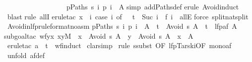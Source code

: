 \begin{isabellebody}
\ \ \ \ \ \ \ \ \ \ \ \ \ \ \ \ {\isasymlongrightarrow}\ {\isacharparenleft}{\isasymexists}\ p{\isasymin}Paths\ s{\isachardot}\ {\isasymforall}i{\isachardot}\ p\ i\ {\isasymnotin}\ A{\isacharparenright}{\isachardoublequote}\isanewline
{}simp\ add{\isacharcolon}Paths{\isacharunderscore}def{\isacharparenright}\isanewline
{}erule\ Avoid{\isachardot}induct{\isacharparenright}\isanewline
\ blast{\isacharparenright}\isanewline
{}rule\ allI{\isacharparenright}\isanewline
{}erule{\isacharunderscore}tac\ x\ {\isacharequal}\ {\isachardoublequote}{\isasymlambda}i{\isachardot}\ case\ i\ of\ \ {\isasymRightarrow}\ t\ {\isacharbar}\ Suc\ i\ {\isasymRightarrow}\ f\ i{\isachardoublequote}\ \ allE{\isacharparenright}\isanewline
{}force\ split{\isacharcolon}nat{\isachardot}split{\isacharparenright}\isanewline
\isanewline
{}\ Avoid{\isacharunderscore}in{\isacharunderscore}lfp{\isacharbrackleft}rule{\isacharunderscore}format{\isacharparenleft}no{\isacharunderscore}asm{\isacharparenright}{\isacharbrackright}{\isacharcolon}\isanewline
{\isachardoublequote}{\isasymforall}p{\isasymin}Paths\ s{\isachardot}\ {\isasymexists}i{\isachardot}\ p\ i\ {\isasymin}\ A\ {\isasymLongrightarrow}\ t\ {\isasymin}\ Avoid\ s\ A\ {\isasymlongrightarrow}\ t\ {\isasymin}\ lfp{\isacharparenleft}af\ A{\isacharparenright}{\isachardoublequote}\isanewline
{}subgoal{\isacharunderscore}tac\ {\isachardoublequote}wf{\isacharbraceleft}{\isacharparenleft}y{\isacharcomma}x{\isacharparenright}{\isachardot}\ {\isacharparenleft}x{\isacharcomma}y{\isacharparenright}{\isasymin}M\ {\isasymand}\ x\ {\isasymin}\ Avoid\ s\ A\ {\isasymand}\ y\ {\isasymin}\ Avoid\ s\ A\ {\isasymand}\ x\ {\isasymnotin}\ A{\isacharbraceright}{\isachardoublequote}{\isacharparenright}\isanewline
\ erule{\isacharunderscore}tac\ a\ {\isacharequal}\ t\ \ wf{\isacharunderscore}induct{\isacharparenright}\isanewline
\ clarsimp{\isacharparenright}\isanewline
\ rule\ ssubst\ {\isacharbrackleft}OF\ lfp{\isacharunderscore}Tarski{\isacharbrackleft}OF\ mono{\isacharunderscore}af{\isacharbrackright}{\isacharbrackright}{\isacharparenright}\isanewline
\ unfold\ af{\isacharunderscore}def{\isacharparenright}\isanewline

\end{isabellebody}

